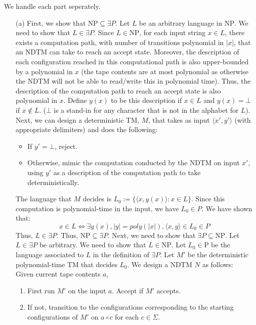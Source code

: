 \documentclass[12pt]{article}
\begin{document}
\begin{solution}
    We handle each part seperately. 
    \begin{enumerate}
        \item[(a)]
        First, we show that $\text{NP} \subseteq \exists P$. Let $L$ be an arbitrary language in $\text{NP}$. We need to show that $L \in \exists P$. \bbni 
        Since $L \in \text{NP}$, for each input string $x \in L$, there exists a computation path, with number of transitions polynomial in $|x|$, that an NDTM can take to reach an accept state. Moreover, the description of each configuration reached in this computational path is also upper-bounded by a polynomial in $x$ (the tape contents are at most polynomial as otherwise the NDTM will not be able to read/write this in polynomial time). Thus, the description of the computation path to reach an accept state is also polynomial in $x$. \bbni 
        Define $y(x)$ to be this description if $x \in L$ and $y(x) = \bot$ if $x \not \in L$. ($\bot$ is a stand-in for any character that is not in the alphabet for $L$). \bbni
        Next, we can design a deterministic TM, $M$, that takes as input $\langle x', y'\rangle$ (with appropriate delimiters) and does the following: 
        \begin{itemize}
            \item If $y' = \bot$, reject. 
            \item Otherwise, mimic the computation conducted by the NDTM on input $x'$, using $y'$ as a description of the computation path to take deterministically.  
        \end{itemize}
        The language that $M$ decides is $L_0 := \{ \langle x, y(x) \rangle : x \in L\}$. Since this computation is polynomial-time in the input, we have $L_0 \in P$. We have shown that: 
        \[ x \in L \iff \exists y(x), |y| = poly(|x|), \langle x, y \rangle \in L_0 \in P\]
        Thus, $L \in \exists P$. Thus, $\text{NP} \subseteq \exists P$. \bbni 
        Next, we need to show that $\exists P \subseteq \text{NP}$. Let $L \in \exists P$ be arbitrary. We need to show that $L \in \text{NP}$. \bbni
        Let $L_0 \in \text{P}$ be the language associated to $L$ in the definition of $\exists P$. Let $M'$ be the deterministic polynomial-time TM that decides $L_0$. We design a NDTM $N$ as follows: Given current tape contents $a$,
        \begin{enumerate}
            \item First run $M'$ on the input $a$. Accept if $M'$ accepts.
            \item If not, transition to the configurations corresponding to the starting configurations of $M'$ on $a \circ c$ for each $c \in \Sigma$.

\end{enumerate}
\end{enumerate}
\end{solution}
\end{document}
